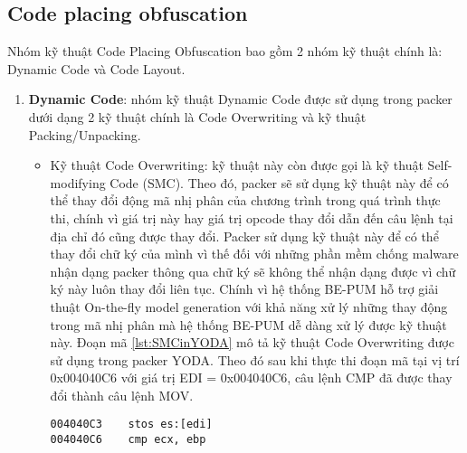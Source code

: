 \subsection{Code placing obfuscation}\label{subsec:Packer1Tech}
\hspace{0.5cm}Nhóm kỹ thuật Code Placing Obfuscation bao gồm 2 nhóm kỹ thuật chính là: Dynamic Code và Code Layout.
\begin{enumerate}
\item{\textbf{Dynamic Code}: nhóm kỹ thuật Dynamic Code được sử dụng trong packer dưới dạng 2 kỹ thuật chính là Code Overwriting và kỹ thuật Packing/Unpacking.  
\begin{itemize}
\item{Kỹ thuật Code Overwriting: kỹ thuật này còn được gọi là kỹ thuật Self-modifying Code (SMC). Theo đó, packer sẽ sử dụng kỹ thuật này để có thể thay đổi động mã nhị phân của chương trình trong quá trình thực thi, chính vì giá trị này hay giá trị opcode thay đổi dẫn đến câu lệnh tại địa chỉ đó cũng được thay đổi. Packer sử dụng kỹ thuật này để có thể thay đổi chữ ký của mình vì thế đối với những phần mềm chống malware nhận dạng packer thông qua chữ ký sẽ không thể nhận dạng được vì chữ ký này luôn thay đổi liên tục. Chính vì hệ thống BE-PUM hỗ trợ giải thuật On-the-fly model generation với khả năng xử lý những thay động trong mã nhị phân mà hệ thống BE-PUM dễ dàng xử lý được kỹ thuật này. Đoạn mã \ref {lst:SMCinYODA} mô tả kỹ thuật Code Overwriting được sử dụng trong packer YODA. Theo đó sau khi thực thi đoạn mã tại vị trí 0x004040C6 với giá trị EDI = 0x004040C6, câu lệnh CMP đã được thay đổi thành câu lệnh MOV. 
\begin{code}
\begin{lstlisting}[captionpos=b,caption={Kỹ thuật Code Overwriting sử dụng trong packer YODA},label={lst:SMCinYODA},frame=single]
004040C3	stos es:[edi]
004040C6	cmp ecx, ebp


\end{lstlisting}
\end{code}}
\end{itemize}}
\end{enumerate}
